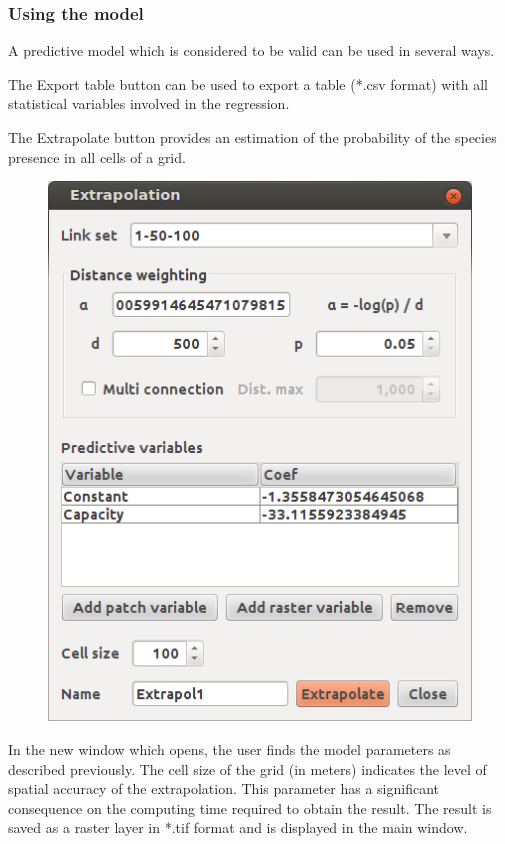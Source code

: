 \documentclass{article}
\begin{document}
\subsubsection{Using the model}

A predictive model which is considered to be valid can be used in several ways.

The Export table button can be used to export a table (*.csv format) with all statistical variables involved in the regression.

The Extrapolate button provides an estimation of the probability of the species presence in all cells of a grid. 


\begin{figure}[H]
	\includegraphics[scale=0.5]{img/manual-en_img15.png}
\end{figure}


In the new window which opens, the user finds the model parameters as described previously. The cell size of the grid (in meters) indicates the level of spatial accuracy of the extrapolation. This parameter has a significant consequence on the computing time required to obtain the result. The result is saved as a raster layer in *.tif format and is displayed in the main window.
\end{document}
